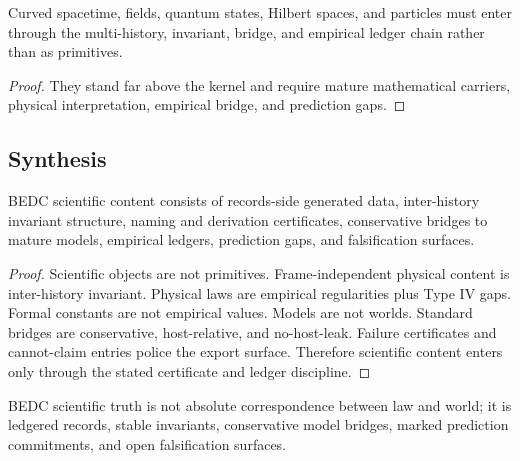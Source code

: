 \begin{corollary}
\label{cor:philosophy-high-level-physical-objects-not-primitives}
Curved spacetime, fields, quantum states, Hilbert spaces, and particles
must enter through the multi-history, invariant, bridge, and empirical
ledger chain rather than as primitives.
\end{corollary}
\begin{proof}
They stand far above the kernel and require mature mathematical
carriers, physical interpretation, empirical bridge, and prediction
gaps.
\end{proof}

\subsection{Synthesis}
\label{subsec:philosophy-science-bridge-synthesis}

\begin{theorem}
\label{thm:philosophy-scientific-object-model-bridge-synthesis}
BEDC scientific content consists of records-side generated data,
inter-history invariant structure, naming and derivation certificates,
conservative bridges to mature models, empirical ledgers, prediction
gaps, and falsification surfaces.
\end{theorem}
\begin{proof}
Scientific objects are not primitives. Frame-independent physical
content is inter-history invariant. Physical laws are empirical
regularities plus Type IV gaps. Formal constants are not empirical
values. Models are not worlds. Standard bridges are conservative,
host-relative, and no-host-leak. Failure certificates and
cannot-claim entries police the export surface. Therefore scientific
content enters only through the stated certificate and ledger
discipline.
\end{proof}

\begin{corollary}
\label{cor:philosophy-scientific-truth-audited-stability}
BEDC scientific truth is not absolute correspondence between law and
world; it is ledgered records, stable invariants, conservative model
bridges, marked prediction commitments, and open falsification
surfaces.
\end{corollary}

